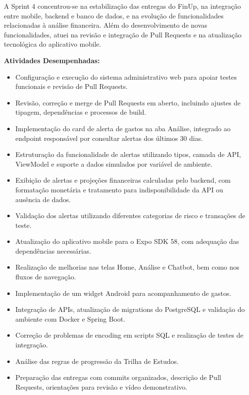 A Sprint 4 concentrou-se na estabilização das entregas do FinUp, na integração
entre mobile, backend e banco de dados, e na evolução de funcionalidades
relacionadas à análise financeira. Além do desenvolvimento de novas
funcionalidades, atuei na revisão e integração de Pull Requests e na atualização
tecnológica do aplicativo mobile.

\textbf{Atividades Desempenhadas:}

\begin{itemize}
\item
  Configuração e execução do sistema administrativo web para apoiar testes
  funcionais e revisão de Pull Requests.
\item
  Revisão, correção e merge de Pull Requests em aberto, incluindo ajustes de
  tipagem, dependências e processos de build.
\item
  Implementação do card de alerta de gastos na aba Análise, integrado ao
  endpoint responsável por consultar alertas dos últimos 30 dias.
\item
  Estruturação da funcionalidade de alertas utilizando tipos, camada de API,
  ViewModel e suporte a dados simulados por variável de ambiente.
\item
  Exibição de alertas e projeções financeiras calculadas pelo backend, com
  formatação monetária e tratamento para indisponibilidade da API ou ausência de
  dados.
\item
  Validação dos alertas utilizando diferentes categorias de risco e transações
  de teste.
\item
  Atualização do aplicativo mobile para o Expo SDK 58, com adequação das
  dependências necessárias.
\item
  Realização de melhorias nas telas Home, Análise e Chatbot, bem como nos
  fluxos de navegação.
\item
  Implementação de um widget Android para acompanhamento de gastos.
\item
  Integração de APIs, atualização de migrations do PostgreSQL e validação do
  ambiente com Docker e Spring Boot.
\item
  Correção de problemas de encoding em scripts SQL e realização de testes de
  integração.
\item
  Análise das regras de progressão da Trilha de Estudos.
\item
  Preparação das entregas com commits organizados, descrição de Pull Requests,
  orientações para revisão e vídeo demonstrativo.
\end{itemize}


